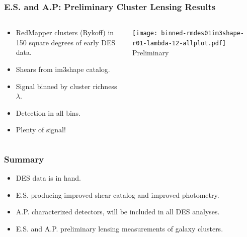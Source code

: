 \documentclass{beamer}
\begin{document}
\frame
{
    \frametitle{E.S. and A.P: Preliminary Cluster Lensing Results}

    \fontsize{9}{0.8\baselineskip}
    \begin{columns}
        \begin{column}{0.4\textwidth}    
            \begin{itemize}
                \item RedMapper clusters (Rykoff) in 150 square degrees of early DES data.
                \item Shears from im3shape catalog.
                \item Signal binned by cluster richness $\lambda$.
                \item Detection in all bins.
                \item Plenty of signal!
            \end{itemize}
        \end{column}
        \begin{column}{0.6\textwidth}
            \begin{center}
                \texttt{[image: binned-rmdes01im3shape-r01-lambda-12-allplot.pdf]}
                \newline
                Preliminary
            \end{center}
        \end{column}
    \end{columns}
}

\frame
{
    \frametitle{Summary}

    \begin{itemize}

        \item DES data is in hand.

        \item E.S. producing improved shear catalog and improved photometry.
        \item A.P. characterized detectors, will be included in all DES analyses.
            
        \item E.S. and A.P. preliminary lensing measurements of galaxy clusters.

    \end{itemize}
}
\end{document}
